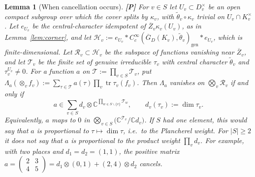 \documentclass[12pt]{article}
\newcommand{\ov}[1]{\overline{#1}}
\newcommand{\C}{\mathbb{C}}
\newcommand{\gen}{\mathrm{gen}}
\newcommand{\tr}{\operatorname{tr}}
\newcommand{\Zb}{\ov{Z}}
\newcommand{\GDb}{\ov{G}_D}
\newcommand{\Pv}{\textbf{[P]}}
\theoremstyle{plain}
\newtheorem{lemma}[theorem]{Lemma}
\theoremstyle{definition}
\begin{document}
\begin{lemma}[When cancellation occurs]\label{lem:cancel}\Pv
For $v\in S$ let $U_v\subset D_v^\times$ be an open compact subgroup over which the cover splits by $\kappa_v$, with $\tilde\theta_v\circ\kappa_v$ trivial on $U_v\cap K_v^\times$. Let $e_{U_v}$ be the central-character idempotent of $\Zb_v\kappa_v(U_v)$, as in Lemma~\ref{lem:corner}, and let $\mathcal H_v:=e_{U_v}*C_c^\infty(\GDb(K_v),\tilde\theta_v)_\gen*e_{U_v}$, which is finite-dimensional. Let $\mathcal R_v\subset\mathcal H_v$ be the subspace of functions vanishing near $\Zb_v$, and let $\mathcal T_v$ be the finite set of genuine irreducible $\tau_v$ with central character $\tilde\theta_v$ and $\tau_v^{U_v}\ne0$. For a function $a$ on $\mathcal T:=\prod_{v\in S}\mathcal T_v$, put $\Lambda_a(\otimes_vf_v):=\sum_{\tau\in\mathcal T}a(\tau)\prod_v\tr\tau_v(f_v)$. Then $\Lambda_a$ vanishes on $\bigotimes_v\mathcal R_v$ if and only if
\[ a\in\sum_{v\in S}d_v\otimes\C^{\prod_{w\in S\smallsetminus\{v\}}\mathcal T_w},\qquad d_v(\tau_v):=\dim\tau_v. \]
Equivalently, $a$ maps to $0$ in $\bigotimes_{v\in S}\big(\C^{\mathcal T_v}/\C d_v\big)$. If $S$ had one element, this would say that $a$ is proportional to $\tau\mapsto\dim\tau$, i.e.\ to the Plancherel weight. For $|S|\ge2$ it does \emph{not} say that $a$ is proportional to the product weight $\prod_vd_v$. For example, with two places and $d_1=d_2=(1,1)$, the positive matrix $a=\left(\begin{smallmatrix}2&3\\4&5\end{smallmatrix}\right)=d_1\otimes(0,1)+(2,4)\otimes d_2$ cancels.
\end{lemma}
\end{document}
